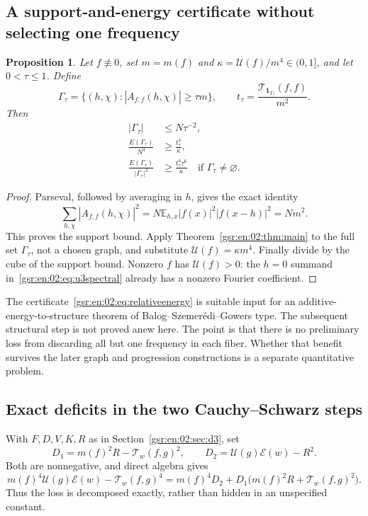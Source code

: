 \documentclass[11pt,letterpaper]{article}
\numberwithin{equation}{section}
\newtheorem{proposition}[theorem]{Proposition}
\theoremstyle{definition}
\theoremstyle{remark}
\newcommand{\E}{\mathbb E}
\newcommand{\one}{\mathbf 1}
\newcommand{\1}{\mathbf 1}
\newcommand{\U}{\mathcal U}
\newcommand{\calE}{\mathcal E}
\newcommand{\calT}{\mathcal T}
\begin{document}
\subsection{A support-and-energy certificate without selecting one frequency}
\begin{proposition}\label{gsr:en:02:prop:spectrum}
Let $f\not\equiv0$, set $m=m(f)$ and $\kappa=\U(f)/m^4\in(0,1]$, and let $0<\tau\leq1$. Define
\[
 \Gamma_\tau=\{(h,\chi):|A_{f,f}(h,\chi)|\geq\tau m\},
 \qquad
 t_\tau=\frac{\calT_{\one_{\Gamma_\tau}}(f,f)}{m^2}.
\]
Then
\begin{align}
 |\Gamma_\tau|&\leq N\tau^{-2}, \label{gsr:en:02:eq:supportbad}\\
 \frac{E(\Gamma_\tau)}{N^3}&\geq\frac{t_\tau^4}{\kappa},\label{gsr:en:02:eq:spectralenergy}\\
 \frac{E(\Gamma_\tau)}{|\Gamma_\tau|^3}
   &\geq\frac{t_\tau^4\tau^6}{\kappa}
   \quad\text{if }\Gamma_\tau\ne\varnothing.\label{gsr:en:02:eq:relativeenergy}
\end{align}
\end{proposition}
\begin{proof}
Parseval, followed by averaging in $h$, gives the exact identity
\[
 \sum_{h,\chi}|A_{f,f}(h,\chi)|^2
 =N\E_{h,x}|f(x)|^2|f(x-h)|^2=Nm^2.
\]
This proves the support bound. Apply Theorem~\ref{gsr:en:02:thm:main} to the full set $\Gamma_\tau$, not a chosen graph, and substitute $\U(f)=\kappa m^4$. Finally divide by the cube of the support bound. Nonzero $f$ has $\U(f)>0$: the $h=0$ summand in~\eqref{gsr:en:02:eq:u3spectral} already has a nonzero Fourier coefficient.
\end{proof}

The certificate~\eqref{gsr:en:02:eq:relativeenergy} is suitable input for an additive-energy-to-structure theorem of Balog--Szemer\'edi--Gowers type. The subsequent structural step is not proved anew here. The point is that there is no preliminary loss from discarding all but one frequency in each fiber. Whether that benefit survives the later graph and progression constructions is a separate quantitative problem.

\subsection{Exact deficits in the two Cauchy--Schwarz steps}
With $F,D,V,K,R$ as in Section~\ref{gsr:en:02:sec:d3}, set
\[
 D_1=m(f)^2R-\calT_w(f,g)^2,\qquad
 D_2=\U(g)\calE(w)-R^2.
\]
Both are nonnegative, and direct algebra gives
\begin{equation}\label{gsr:en:02:eq:deficit}
 m(f)^4\U(g)\calE(w)-\calT_w(f,g)^4
 =m(f)^4D_2+D_1\bigl(m(f)^2R+\calT_w(f,g)^2\bigr).
\end{equation}
Thus the loss is decomposed exactly, rather than hidden in an unspecified constant.
\end{document}
